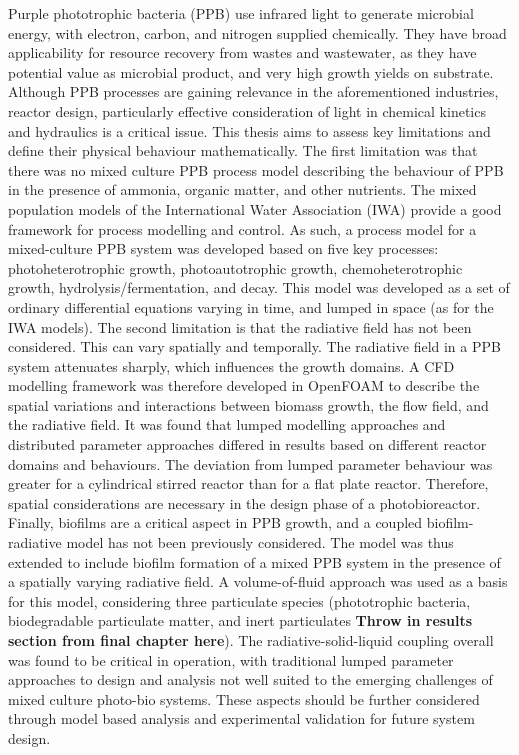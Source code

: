 %
%
%
%
%

Purple phototrophic bacteria (PPB) use infrared light to generate microbial energy, with electron, carbon, and nitrogen supplied chemically. They have broad applicability for resource recovery from wastes and wastewater, as they have potential value as microbial product, and very high growth yields on substrate. Although PPB processes are gaining relevance in the aforementioned industries, reactor design, particularly effective consideration of light in chemical kinetics and hydraulics is a critical issue. This thesis aims to assess key limitations and define their physical behaviour mathematically. The first limitation was that there was no mixed culture PPB process model describing the behaviour of PPB in the presence of ammonia, organic matter, and other nutrients. The mixed population models of the International Water Association (IWA) provide a good framework for process modelling and control. As such, a process model for a mixed-culture PPB system was developed based on five key processes: photoheterotrophic growth, photoautotrophic growth, chemoheterotrophic growth, hydrolysis/fermentation, and decay. This model was developed as a set of ordinary differential equations varying in time, and lumped in space (as for the IWA models). The second limitation is that the radiative field has not been considered. This can vary spatially and temporally. The radiative field in a PPB system attenuates sharply, which influences the growth domains. A CFD modelling framework was therefore developed in OpenFOAM to describe the spatial variations and interactions between biomass growth, the flow field, and the radiative field. It was found that lumped modelling approaches and distributed parameter approaches differed in results based on different reactor domains and behaviours. The deviation from lumped parameter behaviour was greater for a cylindrical stirred reactor than for a flat plate reactor. Therefore, spatial considerations are necessary in the design phase of a photobioreactor. Finally, biofilms are a critical aspect in PPB growth, and a coupled biofilm-radiative model has not been previously considered. The model was thus extended to include biofilm formation of a mixed PPB system in the presence of a spatially varying radiative field. A volume-of-fluid approach was used as a basis for this model, considering three particulate species (phototrophic bacteria, biodegradable particulate matter, and inert particulates \textbf{Throw in results section from final chapter here}). The radiative-solid-liquid coupling overall was found to be critical in operation, with traditional lumped parameter approaches to design and analysis not well suited to the emerging challenges of mixed culture photo-bio systems. These aspects should be further considered through model based analysis and experimental validation for future system design.

%